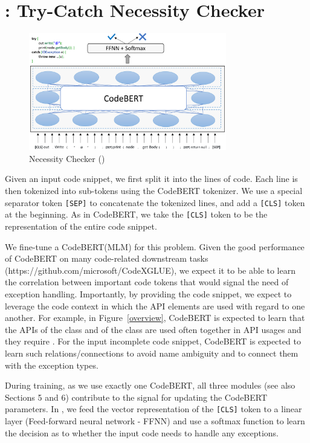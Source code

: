 \section{{\xblock}: Try-Catch Necessity Checker}
\label{xblock:sec}

\begin{figure}[t]
 	\centering
 	\includegraphics[width=3.4in]{xblock-3.png}
        \vspace{-20pt}
 	\caption{ Necessity Checker ({\xblock})}
 	\label{fig:gcn}	
\end{figure}

Given an input code snippet, we first split it into the lines of
code. Each line is then tokenized into sub-tokens using the CodeBERT
tokenizer. We use a special separator token \texttt{[SEP]} to
concatenate the tokenized lines, and add a \texttt{[CLS]} token at the
beginning. As in CodeBERT, we take the \texttt{[CLS]} token to be the
representation of the entire code snippet.

We fine-tune a CodeBERT(MLM) for this problem.  Given the good
performance of CodeBERT on many code-related downstream tasks
(https://github.com/microsoft/CodeXGLUE), we expect it to be able to
learn the correlation between important code tokens that would signal
the need of exception handling. Importantly, by providing the code
snippet, we expect to leverage the code context in which the API
elements are used with regard to one another. For example, in
Figure~\ref{overview}, CodeBERT is expected to learn that the APIs
 of the class  and 
of the class  are used often together in API
usages and they require . For the input incomplete
code snippet, CodeBERT is expected to learn such relations/connections
to avoid name ambiguity and to connect them with the exception types.


During training, as we use exactly one CodeBERT, all three modules
(see also Sections 5 and 6) contribute to the signal for updating the
CodeBERT parameters. In {\xblock}, we feed the vector representation
of the \texttt{[CLS]} token to a linear layer (Feed-forward neural
network - FFNN) and use a softmax function to learn the decision as to
whether the input code needs to handle any exceptions.


